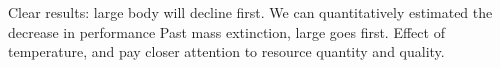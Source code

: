 Clear results: large body will decline first. 
We can quantitatively estimated the decrease in performance
Past mass extinction, large goes first.
Effect of temperature, and pay closer attention to resource quantity and quality.


%


%
%
%
%
%
%  

